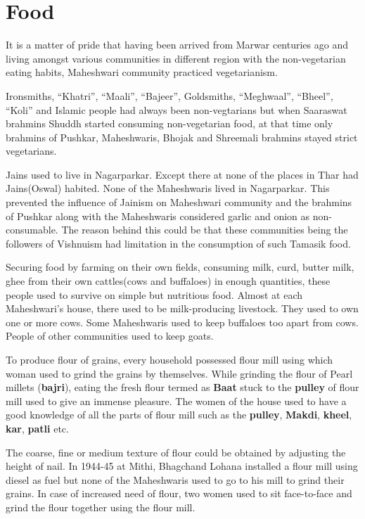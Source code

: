 \section{Food}
It is a matter of pride that having been arrived from Marwar centuries ago and living amongst various communities in different region with the non-vegetarian eating habits, Maheshwari community practiced vegetarianism.

Ironsmiths, ``Khatri'', ``Maali'', ``Bajeer'', Goldsmiths, ``Meghwaal'', ``Bheel'', ``Koli'' and Islamic people had always been non-vegtarians but when Saaraswat brahmins Shuddh started consuming non-vegetarian food, at that time only brahmins of Pushkar, Maheshwaris, Bhojak and Shreemali brahmins stayed strict vegetarians.

Jains used to live in Nagarparkar. Except there at none of the places in Thar had Jains(Oswal) habited. None of the Maheshwaris lived in Nagarparkar. This prevented the influence of Jainism on Maheshwari community and the brahmins of Pushkar along with the Maheshwaris considered garlic and onion as non-consumable. The reason behind this could be that these communities being the followers of Vishnuism had limitation in the consumption of such Tamasik food.

Securing food by farming on their own fields, consuming milk, curd, butter milk, ghee from their own cattles(cows and buffaloes) in enough quantities, these people used to survive on simple but nutritious food. Almost at each Maheshwari's house, there used to be milk-producing livestock. They used to own one or more cows. Some Maheshwaris used to keep buffaloes too apart from cows. People of other communities used to keep goats.

To produce flour of grains, every household possessed flour mill using which woman used to grind the grains by themselves. While grinding the flour of Pearl millets (\textbf{bajri}), eating the fresh flour termed as \textbf{Baat} stuck to the \textbf{pulley} of flour mill used to give an immense pleasure. The women of the house used to have a good knowledge of all the parts of flour mill such as the \textbf{pulley}, \textbf{Makdi}, \textbf{kheel}, \textbf{kar}, \textbf{patli} etc.

The coarse, fine or medium texture of flour could be obtained by adjusting the height of nail. In 1944-45 at Mithi, Bhagchand Lohana installed a flour mill using diesel as fuel but none of the Maheshwaris used to go to his mill to grind their grains. In case of increased need of flour, two women used to sit face-to-face and grind the flour together using the flour mill.


